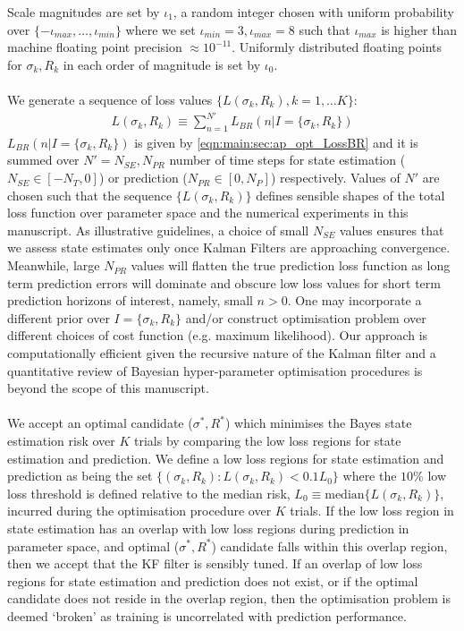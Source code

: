 Scale magnitudes are set by $\iota_1$, a random integer chosen with uniform probability over $\{ -\iota_{max}, \hdots, \iota_{min} \}$ where we set $\iota_{min} = 3, \iota_{max} = 8$  such that $\iota_{max}$ is higher than machine floating point precision $\approx 10^{-11}$. Uniformly distributed floating points for $\sigma_k, R_k $ in each order of magnitude is set by $\iota_0$. 
\\
\\
We generate a sequence of loss values $\{L(\sigma_k, R_k), k = 1, \hdots K\}$:
\begin{align}
L(\sigma_k, R_k) \equiv  \sum_{n=1}^{N'} L_{BR}(n | I= \{\sigma_k, R_k \})
\end{align}
$L_{BR}(n | I= \{\sigma_k, R_k \})$ is given by \cref{eqn:main:sec:ap_opt_LossBR} and it is summed over $N' = N_{SE}, N_{PR}$ number of time steps for state estimation ($ N_{SE} \in  [-N_{T}, 0]$) or prediction ($N_{PR}  \in [0, N_{P}]$) respectively. Values of $N'$ are chosen such that the sequence $\{L(\sigma_k, R_k) \}$ defines sensible shapes of the total loss function over parameter space and the numerical experiments in this manuscript. As illustrative guidelines, a choice of small $N_{SE}$ values ensures that we assess state estimates only once Kalman Filters are approaching convergence. Meanwhile, large $N_{PR}$ values will flatten the true prediction loss function as long term prediction errors will dominate and obscure low loss values for short term prediction horizons of interest, namely, small $n>0$. One may incorporate a different prior over $I= \{\sigma_k, R_k \}$ and/or construct optimisation problem over different choices of cost function (e.g. maximum likelihood). Our approach is computationally efficient given the recursive nature of the Kalman filter and a quantitative review of Bayesian hyper-parameter optimisation procedures is beyond the scope of this manuscript. 
\\
\\
We accept an optimal candidate ($\sigma^*, R^*$) which minimises the Bayes state estimation risk over $K$ trials by comparing the low loss regions for state estimation and prediction. We define a low loss regions for state estimation and prediction as being the set $ \{ (\sigma_k, R_k) : L(\sigma_k, R_k) < 0.1 L_0 \}$ where the $10 \%$ low loss threshold is defined relative to the median risk, $L_0 \equiv \text{median}\{  L(\sigma_k, R_k) \}$, incurred during the optimisation procedure over $K$ trials. If the low loss region in state estimation has an overlap with low loss regions during prediction in parameter space, and optimal ($\sigma^*, R^*$) candidate falls within this overlap region, then we accept that the KF filter is sensibly tuned. If an overlap of low loss regions for state estimation and prediction does not exist, or if the optimal candidate does not reside in the overlap region, then the optimisation problem is deemed `broken' as training is uncorrelated with prediction performance. 
